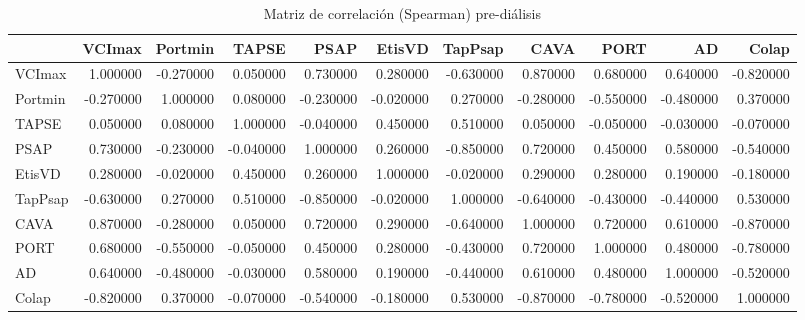 \begin{table}
\caption{Matriz de correlación (Spearman) pre-diálisis}
\label{tab:corr_pre}
\begin{tabular}{lrrrrrrrrrr}
\toprule
 & VCImax & Portmin & TAPSE & PSAP & EtisVD & TapPsap & CAVA & PORT & AD & Colap \\
\midrule
VCImax & 1.000000 & -0.270000 & 0.050000 & 0.730000 & 0.280000 & -0.630000 & 0.870000 & 0.680000 & 0.640000 & -0.820000 \\
Portmin & -0.270000 & 1.000000 & 0.080000 & -0.230000 & -0.020000 & 0.270000 & -0.280000 & -0.550000 & -0.480000 & 0.370000 \\
TAPSE & 0.050000 & 0.080000 & 1.000000 & -0.040000 & 0.450000 & 0.510000 & 0.050000 & -0.050000 & -0.030000 & -0.070000 \\
PSAP & 0.730000 & -0.230000 & -0.040000 & 1.000000 & 0.260000 & -0.850000 & 0.720000 & 0.450000 & 0.580000 & -0.540000 \\
EtisVD & 0.280000 & -0.020000 & 0.450000 & 0.260000 & 1.000000 & -0.020000 & 0.290000 & 0.280000 & 0.190000 & -0.180000 \\
TapPsap & -0.630000 & 0.270000 & 0.510000 & -0.850000 & -0.020000 & 1.000000 & -0.640000 & -0.430000 & -0.440000 & 0.530000 \\
CAVA & 0.870000 & -0.280000 & 0.050000 & 0.720000 & 0.290000 & -0.640000 & 1.000000 & 0.720000 & 0.610000 & -0.870000 \\
PORT & 0.680000 & -0.550000 & -0.050000 & 0.450000 & 0.280000 & -0.430000 & 0.720000 & 1.000000 & 0.480000 & -0.780000 \\
AD & 0.640000 & -0.480000 & -0.030000 & 0.580000 & 0.190000 & -0.440000 & 0.610000 & 0.480000 & 1.000000 & -0.520000 \\
Colap & -0.820000 & 0.370000 & -0.070000 & -0.540000 & -0.180000 & 0.530000 & -0.870000 & -0.780000 & -0.520000 & 1.000000 \\
\bottomrule
\end{tabular}
\end{table}
